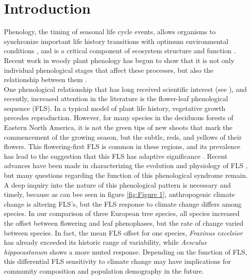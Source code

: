 \documentclass[12pt]{article}\usepackage[]{graphicx}\usepackage[]{color}
\begin{document}
\section*{Introduction}
\indent \indent Phenology, the timing of seasonal life cycle events, allows organisms to synchronize important life history transitions with optimum environmental conditions \citep{Forrest2010}, and is a critical component of ecosystem structure and function \citep{Cleland2007,Piao2007}. Recent work in woody plant phenology has begun to show that it is not only individual phenological stages that affect these processes, but also the relationship between them \citep{Ettinger2018}.\\
\indent One phenological relationship that has long received scientific interest (see \citet{Robertson1895}), and recently, increased attention in the literature is the flower-leaf phenological sequence (FLS). In a typical model of plant life history, vegetative growth precedes reproduction. However, for many species in the deciduous forests of Eastern North America, it is not the green tips of new shoots that mark the commencement of the growing season, but the subtle, reds, and yellows of their flowers. This flowering-first FLS is common in these regions, and its prevalence has lead to the suggestion that this FLS has adaptive significance \citep{Rathcke_1985}. %
Recent advances have been made in characterizing the evolution and physiology of FLS \citep{Gougherty2018,Savage2019}, but many questions regarding the function of this phenological syndrome remain.\\
\indent A deep inquiry into the nature of this phenological pattern is necessary and timely, because as can bee seen in figure \ref{fig:Figure 1}, anthropogenic climate change is altering FLS's, but the FLS response to climate change differs among species. In our comparison of three European tree species, all species increased the offset between flowering and leaf phenophases, but the rate of change varied between species. In fact, the mean FLS offset for one species, \textit{Fraxinus excelsior} has already exceeded its historic range of variability, while \textit{Aesculus hippocastanum} shows a more muted response. Depending on the function of FLS, this differential FLS sensitivity to climate change may have implications for community composition and population demography in the future.\\
\end{document}
